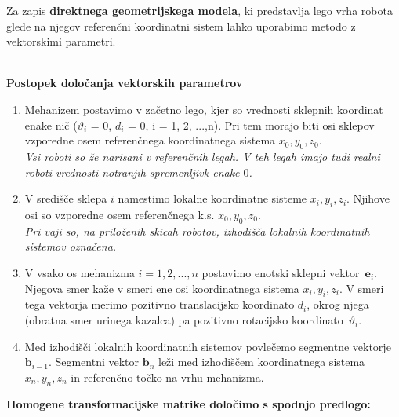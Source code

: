 \vspace{0.2cm}
Za zapis \textbf{direktnega geometrijskega modela}, ki predstavlja
lego vrha robota glede na njegov referenčni koordinatni
sistem lahko uporabimo metodo z vektorskimi parametri.
\\
\\
\begin{mdframed}[backgroundcolor=green!20, shadow=false,roundcorner=12pt,topline
=false, rightline=false,bottomline=false,leftline=false]

\textbf{Postopek določanja vektorskih parametrov}

\begin{enumerate}
    \item \vspace*{-0.35cm} Mehanizem postavimo v začetno lego,
    kjer  so vrednosti sklepnih koordinat enake nič ($\vartheta_i$ =
    0, $d_i$ = 0, i = 1, 2, ...,n). Pri tem morajo biti osi sklepov
    vzporedne osem referenčnega koordinatnega sistema $x_0, y_0, z_0$.
    \\
    \emph{Vsi roboti so \v ze narisani v referenčnih legah. V teh
    legah imajo tudi realni roboti vrednosti notranjih spremenljivk enake $0$.}    \\%
\vspace{-0.4cm}
    \item V središče sklepa $i$ namestimo lokalne
    koordinatne sisteme $x_i, y_i, z_i$. Njihove osi so vzporedne osem referenčnega k.s. $x_0, y_0,
    z_0$.
    \\
    \emph{Pri vaji so, na prilo\v zenih skicah robotov, izhodišča lokalnih
    koordinatnih sistemov označena.}\\%
\vspace{-0.4cm}
    \item V vsako os mehanizma $i = 1, 2, ..., n$
    postavimo enotski sklepni \mbox{vektor $\textbf{e}_i$.} Njegova smer
    kaže v smeri ene osi koordinatnega sistema $x_i, y_i, z_i$. V
    smeri tega vektorja merimo pozitivno translacijsko koordinato $d_i$,
    okrog njega (obratna smer urinega kazalca) pa pozitivno rotacijsko
    \mbox{koordinato $\vartheta_i$.} \\%
\vspace{-0.4cm}
    \item Med izhodišči lokalnih koordinatnih
    sistemov povlečemo segmentne vektorje $\textbf{b}_{i-1}$.
    Segmentni vektor $\textbf{b}_n$ leži med izhodiščem
    koordinatnega sistema $x_n, y_n, z_n$ in referenčno točko na
    vrhu mehanizma.%
\end{enumerate}
\vspace{0.2cm} %
\textbf{Homogene transformacijske matrike določimo s spodnjo
predlogo:}


\end{mdframed}
